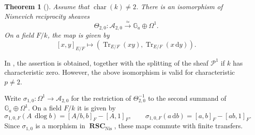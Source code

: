 \documentclass[a4paper,12pt,reqno]{amsart}
\numberwithin{equation}{section}
\newtheorem{thm}{Theorem}[section]
\theoremstyle{definition}
\DeclareMathOperator{\dlog}{dlog}
\DeclareMathOperator{\Tr}{Tr}
\newcommand{\Ga}{\mathbb{G}_{a}}
\renewcommand{\d}{\mathrm{d}}
\newcommand{\RSC}{{\operatorname{\mathbf{RSC}}}}
\newcommand{\Acal}{\mathcal{A}}
\newcommand{\Pcal}{\mathcal{P}}
\newcommand{\GaSharp}{\mathbb{G}_{a}^{\#}}
\newcommand{\Nis}{\mathrm{Nis}}
\begin{document}
\begin{thm}[{\cite[Theorem~5.14 and Theorem~5.15]{RSY22}}]
\label{thm:two}
Assume that $\operatorname{char}(k)\neq2$.  There is an isomorphism of Nisnevich reciprocity
sheaves
\begin{equation}\label{eq:twoiso}
 \Theta_{2,0}:\Acal_{2,0} %
 \xrightarrow{\simeq}
 \Ga\oplus\Omega^1.
\end{equation}
On a field $F/k$, the map is given by
\begin{equation}\label{eq:twofld}
 [x,y]_{E/F}
 \mapsto
 \left(\Tr_{E/F}(xy),\Tr_{E/F}(x\, \d y)\right).
\end{equation}
\end{thm}
In 
\cite[Theorems~5.14 and~5.15]{RSY22}, 
the assertion is obtained, together with the
splitting of the sheaf $\Pcal^1$
if $k$ has characteristic zero. 
However, 
the above isomorphism is valid for characteristic $p\neq 2$.


Write $\sigma_{1,0}:\Omega^1\to\Acal_{2,0}$ for the restriction of $\Theta_{2,0}^{-1}$ to the
second summand of $\Ga\oplus\Omega^1$.  On a field $F/k$ it is given by
\begin{equation}\label{eq:s1}
 \sigma_{1,0,F}(A\, \dlog b)=[A/b,b]_F-[A,1]_F,
 \qquad
 \sigma_{1,0,F}(a\, \d b)=[a,b]_F-[ab,1]_F.
\end{equation}
Since $\sigma_{1,0}$ is a morphism in $\RSC_{\Nis}$, these maps commute with finite
transfers.  
\end{document}
